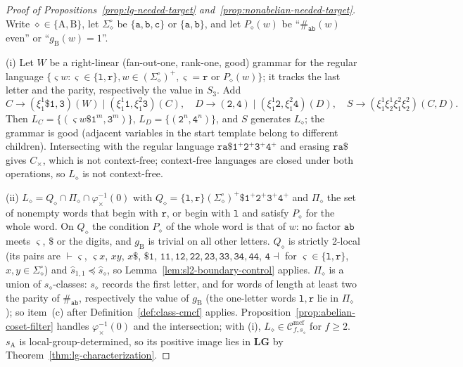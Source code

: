 \documentclass[11pt]{article}
\numberwithin{equation}{section}
\theoremstyle{plain}
\theoremstyle{definition}
\theoremstyle{remark}
\newcommand{\Cmcf}[2]{\mathcal{C}^{\mathrm{mcf}}_{#1,#2}}
\theoremstyle{plain}
\begin{document}
\begin{proof}[Proof of Propositions~\ref{prop:lg-needed-target}
and~\ref{prop:nonabelian-needed-target}]
Write $\diamond\in\{\mathrm A,\mathrm B\}$, let $\Sigma_\diamond^\circ$ be $\{\mathtt a,\mathtt b,
\mathtt c\}$ or $\{\mathtt a,\mathtt b\}$, and let $P_\diamond(w)$ be ``$\#_{\mathtt{ab}}(w)$
even'' or ``$g_{\mathrm B}(w)=1$''.

(i) Let $W$ be a right-linear (fan-out-one, rank-one, good) grammar for the regular
language $\{\varsigma w:\varsigma\in\{\mathtt l,\mathtt r\},w\in(\Sigma_\diamond^\circ)^+,
\varsigma=\mathtt r\text{ or }P_\diamond(w)\}$; it tracks the last letter and the parity,
respectively the value in $S_3$.  Add
\[
 C\to(\xi_1^1\mathtt\$\mathtt 1,\mathtt 3)(W)\mid(\xi_1^1\mathtt 1,\xi_1^2\mathtt 3)(C),\quad
 D\to(\mathtt 2,\mathtt 4)\mid(\xi_1^1\mathtt 2,\xi_1^2\mathtt 4)(D),\quad
 S\to(\xi_1^1\xi_2^1\xi_1^2\xi_2^2)(C,D).
\]
Then $L_C=\{(\varsigma w\mathtt\$\mathtt 1^m,\mathtt 3^m)\}$, $L_D=\{(\mathtt 2^n,\mathtt 4^n)\}$,
and $S$ generates $L_\diamond$; the grammar is good (adjacent variables in the start
template belong to different children).  Intersecting with the regular language
$\mathtt{ra\$}\mathtt 1^+\mathtt 2^+\mathtt 3^+\mathtt 4^+$ and erasing $\mathtt{ra\$}$
gives $C_\times$, which is not context-free; context-free languages are closed
under both operations, so $L_\diamond$ is not context-free.

(ii) $L_\diamond=Q_\diamond\cap\Pi_\diamond\cap\varphi_\times^{-1}(0)$ with
$Q_\diamond=\{\mathtt l,\mathtt r\}(\Sigma_\diamond^\circ)^+\mathtt\$\mathtt 1^+\mathtt 2^+\mathtt 3^+
\mathtt 4^+$ and $\Pi_\diamond$ the set of nonempty words that begin with $\mathtt r$, or begin
with $\mathtt l$ and satisfy $P_\diamond$ for the whole word.  On $Q_\diamond$ the condition $P_\diamond$ of
the whole word is that of $w$: no factor $\mathtt{ab}$ meets $\varsigma$, $\mathtt\$$ or
the digits, and $g_{\mathrm B}$ is trivial on all other letters.  $Q_\diamond$ is strictly
2-local (its pairs are $\vdash\varsigma$, $\varsigma x$, $xy$, $x\mathtt\$$, $\mathtt{\$1}$,
$\mathtt{11},\mathtt{12},\mathtt{22},\mathtt{23},\mathtt{33},\mathtt{34},\mathtt{44}$,
$\mathtt 4\dashv$ for $\varsigma\in\{\mathtt l,\mathtt r\}$, $x,y\in\Sigma_\diamond^\circ$) and
$\widehat s_{1,1}\preceq\widehat s_\diamond$, so Lemma~\ref{lem:sl2-boundary-control} applies.
$\Pi_\diamond$ is a union of $s_\diamond$-classes: $s_\diamond$ records the first letter, and for words
of length at least two the parity of $\#_{\mathtt{ab}}$, respectively the value of
$g_{\mathrm B}$ (the one-letter words $\mathtt l,\mathtt r$ lie in $\Pi_\diamond$); so item~(c)
after Definition~\ref{def:class-cmcf} applies.  Proposition~\ref{prop:abelian-coset-filter}
handles $\varphi_\times^{-1}(0)$ and the intersection; with (i),
$L_\diamond\in\Cmcf{f}{s_\diamond}$ for $f\ge2$.  $s_{\mathrm A}$ is local-group-determined, so its
positive image lies in $\mathbf{LG}$ by Theorem~\ref{thm:lg-characterization}.


\end{proof}
\end{document}
